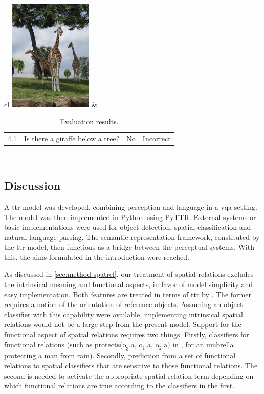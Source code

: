 \begin{table}
\begin{tabular}{cl}
	\includegraphics[width=0.3\textwidth]{vqa4.jpg} &
	\begin{tabular}{llll}
		4.1 & Is there a giraffe below a tree? & No & Incorrect
		\end{tabular} \\
		
  	\end{tabular}
\caption{Evaluation results.}
\label{tab:eval}
\end{table}



\subsection{Discussion}
\label{sec:discussion}

A \gls{ttr} model was developed, combining perception and language in a \gls{vqa} setting.
The model was then implemented in Python using PyTTR.
External systems or basic implementations were used for object detection, spatial classification and natural-language parsing.
The semantic representation framework, constituted by the \gls{ttr} model, then functions as a bridge between the perceptual systems.
With this, the aims formulated in the introduction were reached.


As discussed in \autoref{sec:method-spatrel}, our treatment of spatial relations excludes the intrinsical meaning and functional aspects, in favor of model simplicity and easy implementation.
Both features are treated in terms of \gls{ttr} by \cite{ttrspat}.
The former requires a notion of the orientation of reference objects.
Assuming an object classifier with this capability were available, implementing intrinsical spatial relations would not be a large step from the present model.
Support for the functional aspect of spatial relations requires two things.
Firstly, classifiers for functional relations (such as $\text{protects(o}_3\text{.a, o}_1\text{.a, o}_2\text{.a)}$ in \cite{ttrspat}, for an umbrella protecting a man from rain).
Secondly, prediction from a set of functional relations to spatial classifiers that are sensitive to those functional relations.
The second is needed to activate the appropriate spatial relation term depending on which functional relations are true according to the classifiers in the first.

